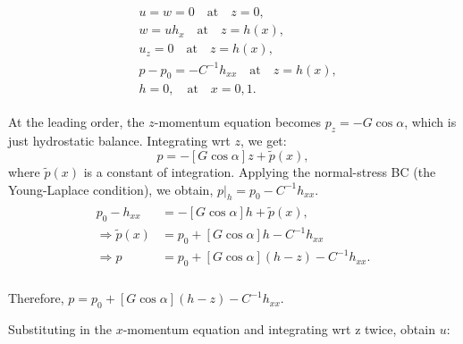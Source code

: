 \documentclass{article}
\begin{document}
\begin{align}\label{eq:pendant_bcs_dimless}
 \begin{split}
  & u = w = 0 \quad \textrm{at} \quad z = 0,\\
  & w = u h_{x} \quad \textrm{at} \quad z = h(x),\\
  & u_{z} = 0 \quad \textrm{at} \quad z = h(x),\\
  & p - p_{0} = -C ^{-1}h_{xx} \quad \textrm{at} \quad z = h(x),\\
  & h = 0, \quad \textrm{at} \quad x = 0, 1.
 \end{split}
\end{align}

At the leading order, the $z$-momentum equation becomes $p_{z} = -G\cos{\alpha}$, which is just hydrostatic balance. Integrating wrt $z$, we get:
\begin{equation}
 p = -[G\cos{\alpha} ]z + \tilde{p}(x),
\end{equation}
where $\tilde{p}(x)$ is a constant of integration. Applying the normal-stress BC (the Young-Laplace condition), we obtain, $p|_{h} = p_{0} - C^{-1}h_{xx}$. 
\begin{align}\label{eq:pendant_get_p}
 \begin{split}
  p_{0} - h_{xx} &= -[G\cos{\alpha}] h + \tilde{p}(x),\\
  \Rightarrow \tilde{p}(x) &= p_{0} + [G\cos{\alpha}] h - C^{-1}h_{xx}\\
  \Rightarrow p &= p_{0} + [G\cos{\alpha}](h - z) - C^{-1}h_{xx}.\\
 \end{split}
\end{align}

Therefore, $\boxed{p = p_{0} + [G\cos{\alpha}](h - z) - C^{-1}h_{xx}}$.

Substituting in the $x$-momentum equation and integrating wrt z twice, obtain $u$:
\end{document}
